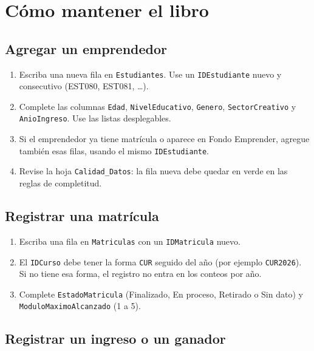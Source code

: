 \documentclass[11pt,a4paper]{article}
\begin{document}
\section{Cómo mantener el libro}

\subsection{Agregar un emprendedor}

\begin{enumerate}[leftmargin=1.6em]
  \item Escriba una nueva fila en \texttt{Estudiantes}. Use un \texttt{IDEstudiante} nuevo y consecutivo (EST080, EST081, \dots).
  \item Complete las columnas \texttt{Edad}, \texttt{NivelEducativo}, \texttt{Genero}, \texttt{SectorCreativo} y \texttt{AnioIngreso}. Use las listas desplegables.
  \item Si el emprendedor ya tiene matrícula o aparece en Fondo Emprender, agregue también esas filas, usando el mismo \texttt{IDEstudiante}.
  \item Revise la hoja \texttt{Calidad\_Datos}: la fila nueva debe quedar en verde en las reglas de completitud.
\end{enumerate}

\subsection{Registrar una matrícula}

\begin{enumerate}[leftmargin=1.6em]
  \item Escriba una fila en \texttt{Matriculas} con un \texttt{IDMatricula} nuevo.
  \item El \texttt{IDCurso} debe tener la forma \texttt{CUR} seguido del año (por ejemplo \texttt{CUR2026}). Si no tiene esa forma, el registro no entra en los conteos por año.
  \item Complete \texttt{EstadoMatricula} (Finalizado, En proceso, Retirado o Sin dato) y \texttt{ModuloMaximoAlcanzado} (1 a 5).
\end{enumerate}

\subsection{Registrar un ingreso o un ganador}
\end{document}
